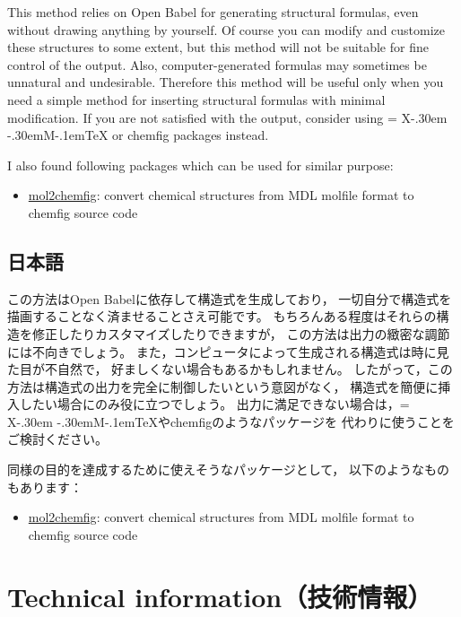 \documentclass[dvipdfmx,12pt]{jsarticle}
\def\XyM{\ifnum\fam=-1\relax\fam=0\relax\fi\TestCount=\fam%
X\kern-.30em\smash{\raise.50ex\hbox{$\fam\TestCount\Upsilon$}}%
\kern-.30em{M}}
\def\XyMTeX{\XyM\kern-.1em\TeX}
\begin{document}
This method relies on Open Babel for generating structural formulas,
even without drawing anything by yourself.
Of course you can modify and customize these structures to some extent,
but this method will not be suitable for fine control of the output.
Also, computer-generated formulas may sometimes be unnatural and undesirable.
Therefore this method will be useful only when you need a simple method
for inserting structural formulas with minimal modification.
If you are not satisfied with the output, consider using {\XyMTeX} or
\textsf{chemfig} packages instead.

I also found following packages which can be used for similar purpose:
\begin{itemize}
  \item \href{http://www.ctan.org/pkg/mol2chemfig}{\textsf{mol2chemfig}}:
    convert chemical structures from MDL molfile format
    to \textsf{chemfig} source code
\end{itemize}

\subsection{日本語}

この方法はOpen Babelに依存して構造式を生成しており，
一切自分で構造式を描画することなく済ませることさえ可能です。
もちろんある程度はそれらの構造を修正したりカスタマイズしたりできますが，
この方法は出力の緻密な調節には不向きでしょう。
また，コンピュータによって生成される構造式は時に見た目が不自然で，
好ましくない場合もあるかもしれません。
したがって，この方法は構造式の出力を完全に制御したいという意図がなく，
構造式を簡便に挿入したい場合にのみ役に立つでしょう。
出力に満足できない場合は，\XyMTeX や\textsf{chemfig}のようなパッケージを
代わりに使うことをご検討ください。

同様の目的を達成するために使えそうなパッケージとして，
以下のようなものもあります：
\begin{itemize}
  \item \href{http://www.ctan.org/pkg/mol2chemfig}{\textsf{mol2chemfig}}:
    convert chemical structures from MDL molfile format
    to \textsf{chemfig} source code
\end{itemize}

\clearpage

\section{Technical information（技術情報）} \label{detail}
\end{document}

